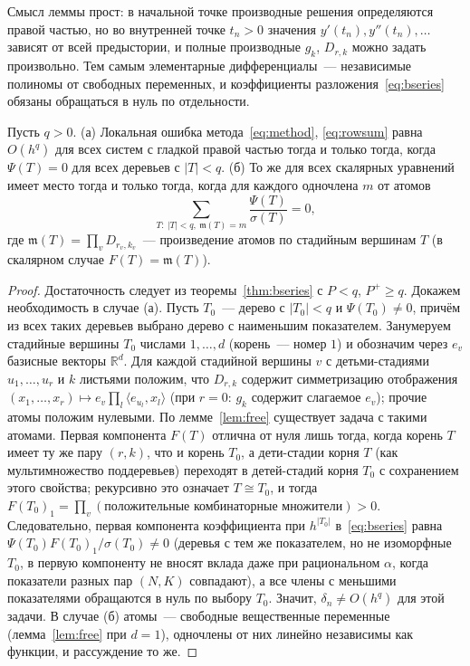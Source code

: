 Смысл леммы прост: в начальной точке производные решения определяются правой частью, но во внутренней точке $t_n>0$ значения $y'(t_n),y''(t_n),\dots$ зависят от всей предыстории, и полные производные $g_k$, $D_{r,k}$ можно задать произвольно. Тем самым элементарные дифференциалы~--- независимые полиномы от свободных переменных, и коэффициенты разложения~\eqref{eq:bseries} обязаны обращаться в нуль по отдельности.

\begin{theorem}\label{thm:necessity}
Пусть $q>0$. (а) Локальная ошибка метода~\eqref{eq:method}, \eqref{eq:rowsum} равна $O(h^q)$ для всех систем с гладкой правой частью тогда и только тогда, когда $\Psi(T)=0$ для всех деревьев с $|T|<q$.
(б) То же для всех скалярных уравнений имеет место тогда и только тогда, когда для каждого одночлена $m$ от атомов
\[
\sum_{T:\ |T|<q,\ \mathfrak m(T)=m}\frac{\Psi(T)}{\sigma(T)}=0,
\]
где $\mathfrak m(T)=\prod_v D_{r_v,k_v}$~--- произведение атомов по стадийным вершинам $T$ (в скалярном случае $F(T)=\mathfrak m(T)$).
\end{theorem}
\begin{proof}
Достаточность следует из теоремы~\ref{thm:bseries} с $P<q$, $P^{+}\ge q$. Докажем необходимость в случае (а). Пусть $T_0$~--- дерево с $|T_0|<q$ и $\Psi(T_0)\ne0$, причём из всех таких деревьев выбрано дерево с наименьшим показателем. Занумеруем стадийные вершины $T_0$ числами $1,\dots,d$ (корень~--- номер $1$) и обозначим через $e_v$ базисные векторы $\mathbb R^d$. Для каждой стадийной вершины $v$ с детьми-стадиями $u_1,\dots,u_r$ и $k$ листьями положим, что $D_{r,k}$ содержит симметризацию отображения $(x_1,\dots,x_r)\mapsto e_v\prod_l\langle e_{u_l},x_l\rangle$ (при $r=0$: $g_k$ содержит слагаемое $e_v$); прочие атомы положим нулевыми. По лемме~\ref{lem:free} существует задача с такими атомами. Первая компонента $F(T)$ отлична от нуля лишь тогда, когда корень $T$ имеет ту же пару $(r,k)$, что и корень $T_0$, а дети-стадии корня $T$ (как мультимножество поддеревьев) переходят в детей-стадий корня $T_0$ с сохранением этого свойства; рекурсивно это означает $T\cong T_0$, и тогда $F(T_0)_1=\prod_v(\text{положительные комбинаторные множители})>0$. Следовательно, первая компонента коэффициента при $h^{|T_0|}$ в~\eqref{eq:bseries} равна $\Psi(T_0)F(T_0)_1/\sigma(T_0)\ne0$ (деревья с тем же показателем, но не изоморфные $T_0$, в первую компоненту не вносят вклада даже при рациональном $\alpha$, когда показатели разных пар $(N,K)$ совпадают), а все члены с меньшими показателями обращаются в нуль по выбору $T_0$. Значит, $\delta_n\ne O(h^q)$ для этой задачи. В случае (б) атомы~--- свободные вещественные переменные (лемма~\ref{lem:free} при $d=1$), одночлены от них линейно независимы как функции, и рассуждение то же.
\end{proof}

